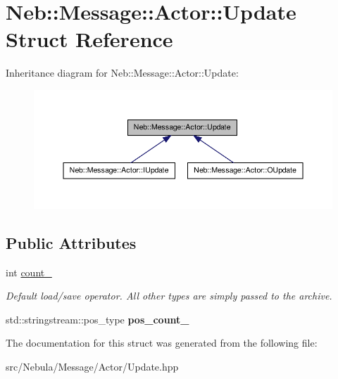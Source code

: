 \hypertarget{structNeb_1_1Message_1_1Actor_1_1Update}{\section{\-Neb\-:\-:\-Message\-:\-:\-Actor\-:\-:\-Update \-Struct \-Reference}
\label{structNeb_1_1Message_1_1Actor_1_1Update}
}


\-Inheritance diagram for \-Neb\-:\-:\-Message\-:\-:\-Actor\-:\-:\-Update\-:\nopagebreak
\begin{figure}[H]
\begin{center}
\leavevmode
\includegraphics[width=350pt]{structNeb_1_1Message_1_1Actor_1_1Update__inherit__graph}
\end{center}
\end{figure}
\subsection*{\-Public \-Attributes}
\begin{DoxyCompactItemize}
\item 
\hypertarget{structNeb_1_1Message_1_1Actor_1_1Update_a4e82d6d5a0a84f6593b7322a535fbb6c}{int \hyperlink{structNeb_1_1Message_1_1Actor_1_1Update_a4e82d6d5a0a84f6593b7322a535fbb6c}{count\-\_\-}}\label{structNeb_1_1Message_1_1Actor_1_1Update_a4e82d6d5a0a84f6593b7322a535fbb6c}

\begin{DoxyCompactList}\small\item\em \-Default load/save operator. \-All other types are simply passed to the archive. \end{DoxyCompactList}\item 
\hypertarget{structNeb_1_1Message_1_1Actor_1_1Update_afbf7999816776b210f2641cd3a575212}{std\-::stringstream\-::pos\-\_\-type {\bfseries pos\-\_\-count\-\_\-}}\label{structNeb_1_1Message_1_1Actor_1_1Update_afbf7999816776b210f2641cd3a575212}

\end{DoxyCompactItemize}


\-The documentation for this struct was generated from the following file\-:\begin{DoxyCompactItemize}
\item 
src/\-Nebula/\-Message/\-Actor/\-Update.\-hpp\end{DoxyCompactItemize}
